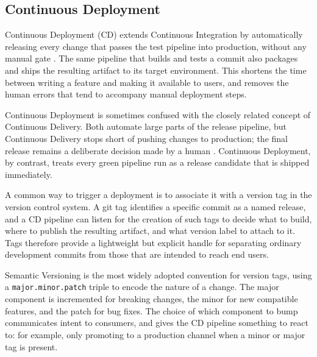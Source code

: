 \subsection{Continuous Deployment}
Continuous Deployment (CD) extends Continuous Integration by automatically releasing every change that passes the test pipeline into production, without any manual gate \cite{b5}. The same pipeline that builds and tests a commit also packages and ships the resulting artifact to its target environment. This shortens the time between writing a feature and making it available to users, and removes the human errors that tend to accompany manual deployment steps.

Continuous Deployment is sometimes confused with the closely related concept of Continuous Delivery. Both automate large parts of the release pipeline, but Continuous Delivery stops short of pushing changes to production; the final release remains a deliberate decision made by a human \cite{b5}. Continuous Deployment, by contrast, treats every green pipeline run as a release candidate that is shipped immediately.

A common way to trigger a deployment is to associate it with a version tag in the version control system. A git tag identifies a specific commit as a named release, and a CD pipeline can listen for the creation of such tags to decide what to build, where to publish the resulting artifact, and what version label to attach to it. Tags therefore provide a lightweight but explicit handle for separating ordinary development commits from those that are intended to reach end users.

Semantic Versioning \cite{b6} is the most widely adopted convention for version tags, using a \texttt{major.minor.patch} triple to encode the nature of a change. The major component is incremented for breaking changes, the minor for new compatible features, and the patch for bug fixes. The choice of which component to bump communicates intent to consumers, and gives the CD pipeline something to react to: for example, only promoting to a production channel when a minor or major tag is present.
